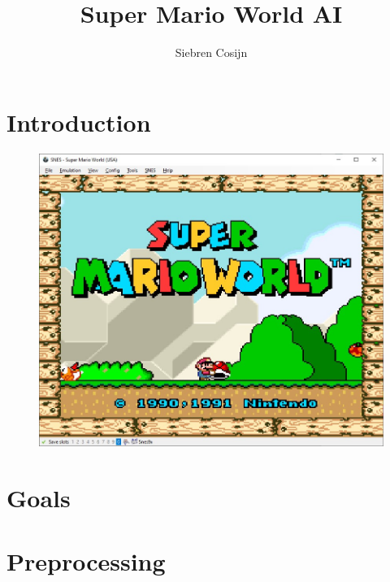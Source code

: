 \documentclass{article}
\title{Super Mario World AI}
\author{Siebren Cosijn}
\begin{document}
    \maketitle
    \section{Introduction}
    \begin{figure}[H]
    \centering
    \includegraphics[width=.85\textwidth]{start-screen}
    \end{figure}

    \section{Goals}

    \section{Preprocessing}
\end{document}
